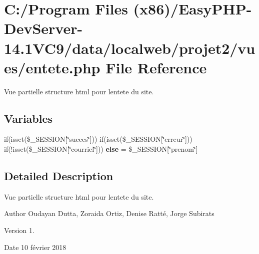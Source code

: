 \hypertarget{entete_8php}{}\section{C\+:/\+Program Files (x86)/\+Easy\+P\+H\+P-\/\+Dev\+Server-\/14.1\+V\+C9/data/localweb/projet2/vues/entete.php File Reference}
\label{entete_8php}


Vue partielle structure html pour l\textquotesingle{}entete du site.  


\subsection*{Variables}
\begin{DoxyCompactItemize}
\item 
\mbox{\label{entete_8php_a6d97074e88f4121d8dd1bb254d3eed3f}} 
if(isset(\$\+\_\+\+S\+E\+S\+S\+I\+ON\mbox{[}\char`\"{}succes\char`\"{}\mbox{]})) if(isset(\$\+\_\+\+S\+E\+S\+S\+I\+ON\mbox{[}\char`\"{}erreur\char`\"{}\mbox{]})) if(!isset(\$\+\_\+\+S\+E\+S\+S\+I\+ON\mbox{[}\char`\"{}courriel\char`\"{}\mbox{]})) {\bfseries else} = \$\+\_\+\+S\+E\+S\+S\+I\+ON\mbox{[}\char`\"{}prenom\char`\"{}\mbox{]}
\end{DoxyCompactItemize}


\subsection{Detailed Description}
Vue partielle structure html pour l\textquotesingle{}entete du site. 

\begin{DoxyAuthor}{Author}
Oudayan Dutta, Zoraida Ortiz, Denise Ratté, Jorge Subirats 
\end{DoxyAuthor}
\begin{DoxyVersion}{Version}
1. 
\end{DoxyVersion}
\begin{DoxyDate}{Date}
10 février 2018 
\end{DoxyDate}
